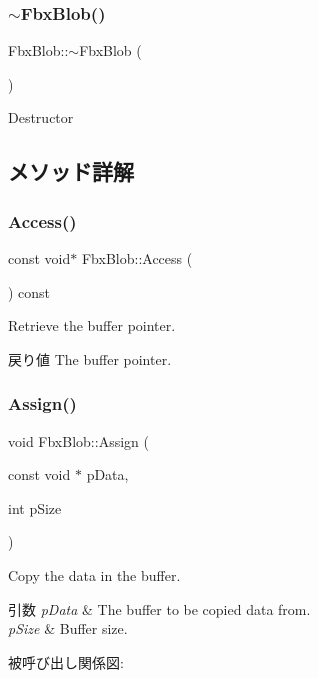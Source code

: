\subsubsection{\texorpdfstring{$\sim$\+Fbx\+Blob()}{~FbxBlob()}}
{\footnotesize\ttfamily Fbx\+Blob\+::$\sim$\+Fbx\+Blob (\begin{DoxyParamCaption}{ }\end{DoxyParamCaption})}



Destructor 



\subsection{メソッド詳解}
\mbox{\label{class_fbx_blob_a5fb39826dd62378bcf18b4de9db38509}} 
\subsubsection{\texorpdfstring{Access()}{Access()}}
{\footnotesize\ttfamily const void$\ast$ Fbx\+Blob\+::\+Access (\begin{DoxyParamCaption}{ }\end{DoxyParamCaption}) const}

Retrieve the buffer pointer. \begin{DoxyReturn}{戻り値}
The buffer pointer. 
\end{DoxyReturn}
\mbox{\label{class_fbx_blob_a9370942703afba1f51798ff5ac2b0ec5}} 
\subsubsection{\texorpdfstring{Assign()}{Assign()}}
{\footnotesize\ttfamily void Fbx\+Blob\+::\+Assign (\begin{DoxyParamCaption}\item[{const void $\ast$}]{p\+Data,  }\item[{int}]{p\+Size }\end{DoxyParamCaption})}

Copy the data in the buffer. 
\begin{DoxyParams}{引数}
{\em p\+Data} & The buffer to be copied data from. \\
\hline
{\em p\+Size} & Buffer size. \\
\hline
\end{DoxyParams}
被呼び出し関係図\+:
\mbox{\label{class_fbx_blob_abd720fef7ed5feacc8ef21d669e26cce}} 
